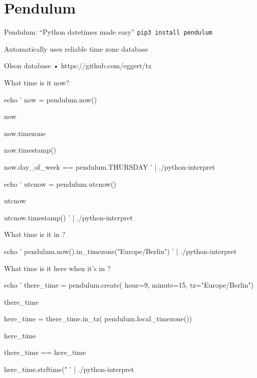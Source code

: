 \documentclass[xcolor=svgnames,17pt]{beamer}
\newcommand*{\sizefont}[1]{%
    \ifcase#1\relax
    \or \tiny
    \or \scriptsize
    \or \footnotesize
    \or \small
    \or \normalsize
    \or \large
    \or \Large
    \or \LARGE
    \or \huge
    \or \Huge
    \fi}
\begin{document}
\section{Pendulum}

\begin{frame}
\tableofcontents[currentsection]
\end{frame}

\begin{frame}{Pendulum: “Python datetimes made easy”}
\texttt{pip3 install pendulum}

\pause

Automatically uses reliable time zone database

\vspace*{\baselineskip}

Olson database • https://github.com/eggert/tz

\end{frame}

\begin{frame}[fragile]{What time is it now?}

{\sizefont{3}
\bash[stdout]
echo '
now = pendulum.now()


now


now.timezone


now.timestamp()


now.day_of_week == pendulum.THURSDAY
' | ./python-interpret
\END
}

\pause

{\sizefont{3}
\bash[stdout]
echo '
utcnow = pendulum.utcnow()


utcnow


utcnow.timestamp()
' | ./python-interpret
\END
}

\end{frame}

\begin{frame}[fragile]{What time is it in \fillinblank?}

{\sizefont{3}
\bash[stdout]
echo '
pendulum.now().in_timezone("Europe/Berlin")
' | ./python-interpret
\END
}
\end{frame}

\begin{frame}[fragile]{What time is it here when it’s \fillinblank in \fillinblank?}

{\sizefont{3}
\bash[stdout]
echo '
there_time = pendulum.create(
    hour=9, minute=15, tz="Europe/Berlin")


there_time


here_time = there_time.in_tz(
    pendulum.local_timezone())


here_time


there_time == here_time


here_time.strftime("%
' | ./python-interpret
\END
}
\end{frame}
\end{document}

